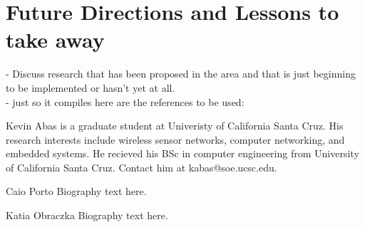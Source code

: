 \documentclass[journal,transmag]{IEEEtran}
\begin{document}
\section{Future Directions and Lessons to take away}
\-- Discuss research that has been proposed in the area and that is just beginning to be implemented or hasn't yet at all.\\

\-- just so it compiles here are the references to be used:
~\cite{HuSIMS}
~\cite{Citric}
~\cite{OmniEye}
~\cite{DTNSmartCamera}
~\cite{SensEye}
~\cite{WiFLIP}
~\cite{AccLatEnergy}
~\cite{MeshEye}
~\cite{EnergyCons}
~\cite{Flexi-WVSNP}






{}




\begin{IEEEbiographynophoto}{Kevin Abas}
is a graduate student at Univeristy of California Santa Cruz. His research
interests include wireless sensor networks, computer networking, and embedded
systems. He recieved his BSc in computer engineering from University of
California Santa Cruz. Contact him at kabas@soe.ucsc.edu.
\end{IEEEbiographynophoto}

\begin{IEEEbiographynophoto}{Caio Porto}
Biography text here.
\end{IEEEbiographynophoto}

\begin{IEEEbiographynophoto}{Katia Obraczka}
Biography text here.
\end{IEEEbiographynophoto}
\end{document}
